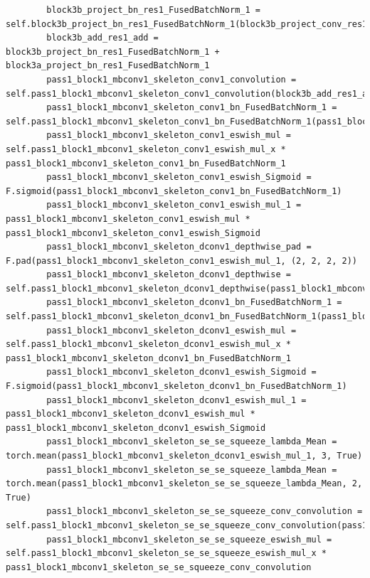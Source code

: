 \documentclass{fisatprojectfinal}
\begin{document}
\begin{appendices}
\begin{lstlisting}
        block3b_project_bn_res1_FusedBatchNorm_1 = self.block3b_project_bn_res1_FusedBatchNorm_1(block3b_project_conv_res1_convolution)
        block3b_add_res1_add = block3b_project_bn_res1_FusedBatchNorm_1 + block3a_project_bn_res1_FusedBatchNorm_1
        pass1_block1_mbconv1_skeleton_conv1_convolution = self.pass1_block1_mbconv1_skeleton_conv1_convolution(block3b_add_res1_add)
        pass1_block1_mbconv1_skeleton_conv1_bn_FusedBatchNorm_1 = self.pass1_block1_mbconv1_skeleton_conv1_bn_FusedBatchNorm_1(pass1_block1_mbconv1_skeleton_conv1_convolution)
        pass1_block1_mbconv1_skeleton_conv1_eswish_mul = self.pass1_block1_mbconv1_skeleton_conv1_eswish_mul_x * pass1_block1_mbconv1_skeleton_conv1_bn_FusedBatchNorm_1
        pass1_block1_mbconv1_skeleton_conv1_eswish_Sigmoid = F.sigmoid(pass1_block1_mbconv1_skeleton_conv1_bn_FusedBatchNorm_1)
        pass1_block1_mbconv1_skeleton_conv1_eswish_mul_1 = pass1_block1_mbconv1_skeleton_conv1_eswish_mul * pass1_block1_mbconv1_skeleton_conv1_eswish_Sigmoid
        pass1_block1_mbconv1_skeleton_dconv1_depthwise_pad = F.pad(pass1_block1_mbconv1_skeleton_conv1_eswish_mul_1, (2, 2, 2, 2))
        pass1_block1_mbconv1_skeleton_dconv1_depthwise = self.pass1_block1_mbconv1_skeleton_dconv1_depthwise(pass1_block1_mbconv1_skeleton_dconv1_depthwise_pad)
        pass1_block1_mbconv1_skeleton_dconv1_bn_FusedBatchNorm_1 = self.pass1_block1_mbconv1_skeleton_dconv1_bn_FusedBatchNorm_1(pass1_block1_mbconv1_skeleton_dconv1_depthwise)
        pass1_block1_mbconv1_skeleton_dconv1_eswish_mul = self.pass1_block1_mbconv1_skeleton_dconv1_eswish_mul_x * pass1_block1_mbconv1_skeleton_dconv1_bn_FusedBatchNorm_1
        pass1_block1_mbconv1_skeleton_dconv1_eswish_Sigmoid = F.sigmoid(pass1_block1_mbconv1_skeleton_dconv1_bn_FusedBatchNorm_1)
        pass1_block1_mbconv1_skeleton_dconv1_eswish_mul_1 = pass1_block1_mbconv1_skeleton_dconv1_eswish_mul * pass1_block1_mbconv1_skeleton_dconv1_eswish_Sigmoid
        pass1_block1_mbconv1_skeleton_se_se_squeeze_lambda_Mean = torch.mean(pass1_block1_mbconv1_skeleton_dconv1_eswish_mul_1, 3, True)
        pass1_block1_mbconv1_skeleton_se_se_squeeze_lambda_Mean = torch.mean(pass1_block1_mbconv1_skeleton_se_se_squeeze_lambda_Mean, 2, True)
        pass1_block1_mbconv1_skeleton_se_se_squeeze_conv_convolution = self.pass1_block1_mbconv1_skeleton_se_se_squeeze_conv_convolution(pass1_block1_mbconv1_skeleton_se_se_squeeze_lambda_Mean)
        pass1_block1_mbconv1_skeleton_se_se_squeeze_eswish_mul = self.pass1_block1_mbconv1_skeleton_se_se_squeeze_eswish_mul_x * pass1_block1_mbconv1_skeleton_se_se_squeeze_conv_convolution

\end{lstlisting}
\end{appendices}
\end{document}
